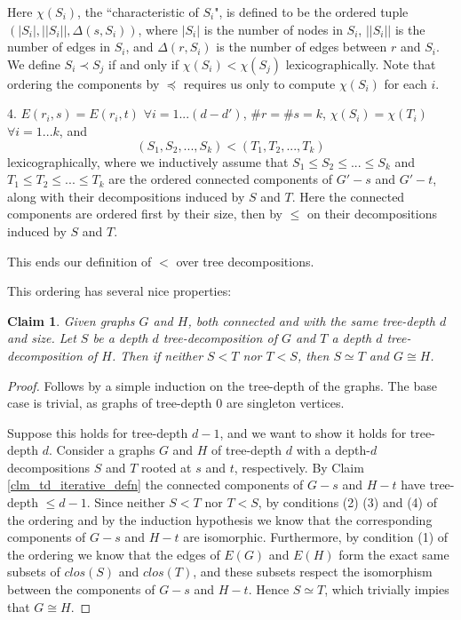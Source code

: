 \documentclass[11pt]{report}
\newtheorem{claim}{Claim}
\begin{document}
Here $\chi(S_i)$, the ``characteristic of $S_i$", is defined to be the ordered tuple $(|S_i|, ||S_i||, \Delta(s,S_i))$, where $|S_i|$ is the number of nodes in $S_i$, $||S_i||$ is the number of edges in $S_i$, and $\Delta(r,S_i)$ is the number of edges between $r$ and $S_i$. We define $S_i \prec S_j$ if and only if $\chi(S_i)<\chi(S_j)$ lexicographically. Note that ordering the components by $\preceq$ requires us only to compute $\chi(S_i)$ for each $i$.


4. $E(r_i, s)=E(r_i,t)$ $\forall i=1...(d-d')$, $\#r = \#s =k$, $\chi(S_i)=\chi(T_i)$  $\forall i=1...k$, and \[(S_1, S_2, ... ,S_k) < (T_1, T_2, ..., T_k)\] lexicographically, where we inductively assume that $S_1 \leq S_2 \leq ... \leq S_k$ and $T_1 \leq T_2 \leq ... \leq T_k$ are the ordered connected components of $G'-s$ and $G'-t$, along with their decompositions induced by $S$ and $T$. Here the connected components are ordered first by their size, then by $\leq$ on their decompositions induced by $S$ and $T$.

This ends our definition of $<$ over tree decompositions.







\newpage

This ordering has several nice properties:


\begin{claim} Given graphs $G$ and $H$, both connected and with the same tree-depth $d$ and size. Let $S$ be a depth $d$ tree-decomposition of $G$ and $T$ a depth $d$ tree-decomposition of $H$. Then if neither $S<T$ nor $T<S$, then $S\simeq T$ and $G\cong H$.
\end{claim}
\begin{proof}
Follows by a simple induction on the tree-depth of the graphs. The base case is trivial, as graphs of tree-depth $0$ are singleton vertices.

Suppose this holds for tree-depth $d-1$, and we want to show it holds for tree-depth $d$. Consider a graphs $G$ and $H$ of tree-depth $d$ with a depth-$d$ decompositions $S$ and $T$ rooted at $s$ and $t$, respectively. By Claim \ref{clm_td_iterative_defn} the connected components of $G-s$ and $H-t$ have tree-depth $\leq d-1$. Since neither $S<T$ nor $T<S$, by conditions (2) (3) and (4) of the ordering and by the induction hypothesis we know that the corresponding components of $G-s$ and $H-t$ are isomorphic. Furthermore, by condition (1) of the ordering we know that the edges of $E(G)$ and $E(H)$ form the exact same subsets of $clos(S)$ and $clos(T)$, and these subsets respect the isomorphism between the components of $G-s$ and $H-t$. Hence $S \simeq T$, which trivially impies that $G\cong H$.


\end{proof}
\end{document}
